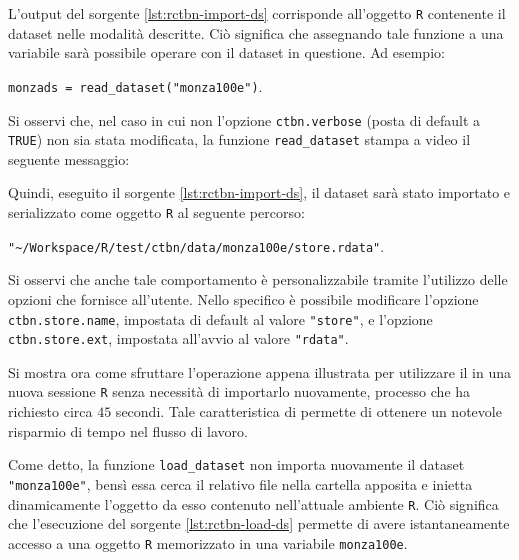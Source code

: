L'output del sorgente \ref{lst:rctbn-import-ds} corrisponde all'oggetto \lstinline$R$ contenente il dataset nelle modalità descritte. Ciò significa che assegnando tale funzione a una variabile sarà possibile operare con il dataset in questione. Ad esempio:

\lstinline[language=rstats]{monzads = read_dataset("monza100e")}.

Si osservi che, nel caso in cui non l'opzione \lstinline$ctbn.verbose$ (posta di default a \lstinline[language=rstats]{TRUE}) non sia stata modificata, la funzione \lstinline[language=rstats]{read_dataset} stampa a video il seguente messaggio:

\vspace*{8pt}\vspace*{8pt}

Quindi, eseguito il sorgente \ref{lst:rctbn-import-ds}, il dataset sarà stato importato e serializzato come oggetto \lstinline$R$ al seguente percorso:

\lstinline[language=rstats]{"~/Workspace/R/test/ctbn/data/monza100e/store.rdata"}.

Si osservi che anche tale comportamento è personalizzabile tramite l'utilizzo delle opzioni che \rctbn{} fornisce all'utente. Nello specifico è possibile modificare l'opzione \lstinline$ctbn.store.name$, impostata di default al valore \lstinline[language=rstats]{"store"}, e l'opzione \lstinline$ctbn.store.ext$, impostata all'avvio al valore \lstinline[language=rstats]{"rdata"}.

Si mostra ora come sfruttare l'operazione appena illustrata per utilizzare il  in una nuova sessione \lstinline$R$ senza necessità di importarlo nuovamente, processo che ha richiesto circa $45$ secondi. Tale caratteristica di \rctbn{} permette di ottenere un notevole risparmio di tempo nel flusso di lavoro.

\vspace*{8pt}
Come detto, la funzione \lstinline[language=rstats]{load_dataset} non importa nuovamente il dataset \lstinline[language=rstats]{"monza100e"}, bensì essa cerca il relativo file  nella cartella apposita e inietta dinamicamente l'oggetto da esso contenuto nell'attuale ambiente \lstinline$R$. Ciò significa che l'esecuzione del sorgente \ref{lst:rctbn-load-ds} permette di avere istantaneamente accesso a una oggetto \lstinline$R$ memorizzato in una variabile \lstinline$monza100e$.

